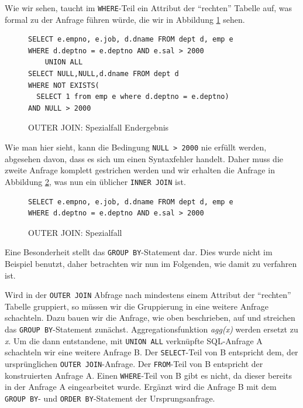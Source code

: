 Wie wir sehen, taucht im \verb|WHERE|-Teil ein Attribut der ``rechten'' Tabelle auf, was formal zu der Anfrage führen würde, die wir in Abbildung \ref{fig:outer_s2} sehen.

\begin{figure}[H]
\begin{verbatim}
SELECT e.empno, e.job, d.dname FROM dept d, emp e
WHERE d.deptno = e.deptno AND e.sal > 2000
    UNION ALL
SELECT NULL,NULL,d.dname FROM dept d 
WHERE NOT EXISTS(
  SELECT 1 from emp e where d.deptno = e.deptno)
AND NULL > 2000
\end{verbatim}
\caption{OUTER JOIN: Spezialfall Endergebnis}
\label{fig:outer_s2}
\end{figure}

Wie man hier sieht, kann die Bedingung \verb|NULL > 2000| nie erfüllt werden, abgesehen davon, dass es sich um einen Syntaxfehler handelt. Daher muss die zweite Anfrage komplett gestrichen werden und wir erhalten die Anfrage in Abbildung \ref{fig:outjoinspez2}, was nun ein üblicher \verb|INNER JOIN| ist.

\begin{figure}[H]
\begin{verbatim}
SELECT e.empno, e.job, d.dname FROM dept d, emp e
WHERE d.deptno = e.deptno AND e.sal > 2000
\end{verbatim}
\caption{OUTER JOIN: Spezialfall}
\label{fig:outjoinspez2}
\end{figure}


Eine Besonderheit stellt das \verb|GROUP BY|-Statement dar. Dies wurde nicht im Beispiel benutzt, daher betrachten wir nun im Folgenden, wie damit zu verfahren ist.

Wird in der \verb|OUTER JOIN| Abfrage nach mindestens einem Attribut der ``rechten'' Tabelle gruppiert, so müssen wir die Gruppierung in eine weitere Anfrage schachteln. Dazu bauen wir die Anfrage, wie oben beschrieben, auf und streichen das \verb|GROUP BY|-Statement zunächst. Aggregationsfunktion \textit{agg(x)} werden ersetzt zu \textit{x}. Um die dann entstandene, mit \verb|UNION ALL| verknüpfte SQL-Anfrage A schachteln wir eine weitere Anfrage B. Der \verb|SELECT|-Teil von B entspricht dem, der ursprünglichen \verb|OUTER JOIN|-Anfrage. Der \verb|FROM|-Teil von B entspricht der konstruierten Anfrage A. Einen \verb|WHERE|-Teil von B gibt es nicht, da dieser bereits in der Anfrage A eingearbeitet wurde. Ergänzt wird die Anfrage B mit dem \verb|GROUP BY|- und \verb|ORDER BY|-Statement der Ursprungsanfrage.

